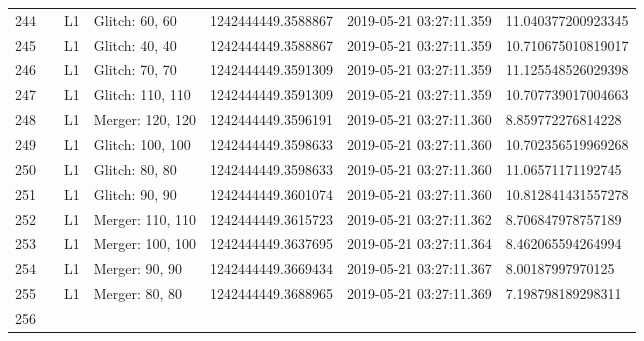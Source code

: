 \begin{longtable}{lllllll}
244  &                                                    &       L1 &    Glitch: 60, 60 &  1242444449.3588867 &  2019-05-21 03:27:11.359 &  11.040377200923345 \\
245  &                                                    &       L1 &    Glitch: 40, 40 &  1242444449.3588867 &  2019-05-21 03:27:11.359 &  10.710675010819017 \\
246  &                                                    &       L1 &    Glitch: 70, 70 &  1242444449.3591309 &  2019-05-21 03:27:11.359 &  11.125548526029398 \\
247  &                                                    &       L1 &  Glitch: 110, 110 &  1242444449.3591309 &  2019-05-21 03:27:11.359 &  10.707739017004663 \\
248  &                                                    &       L1 &  Merger: 120, 120 &  1242444449.3596191 &  2019-05-21 03:27:11.360 &   8.859772276814228 \\
249  &                                                    &       L1 &  Glitch: 100, 100 &  1242444449.3598633 &  2019-05-21 03:27:11.360 &  10.702356519969268 \\
250  &                                                    &       L1 &    Glitch: 80, 80 &  1242444449.3598633 &  2019-05-21 03:27:11.360 &   11.06571171192745 \\
251  &                                                    &       L1 &    Glitch: 90, 90 &  1242444449.3601074 &  2019-05-21 03:27:11.360 &  10.812841431557278 \\
252  &                                                    &       L1 &  Merger: 110, 110 &  1242444449.3615723 &  2019-05-21 03:27:11.362 &   8.706847978757189 \\
253  &                                                    &       L1 &  Merger: 100, 100 &  1242444449.3637695 &  2019-05-21 03:27:11.364 &   8.462065594264994 \\
254  &                                                    &       L1 &    Merger: 90, 90 &  1242444449.3669434 &  2019-05-21 03:27:11.367 &    8.00187997970125 \\
255  &                                                    &       L1 &    Merger: 80, 80 &  1242444449.3688965 &  2019-05-21 03:27:11.369 &   7.198798189298311 \\
256  &                                                    &          &                   &                     &                          &                     \\

\end{longtable}
